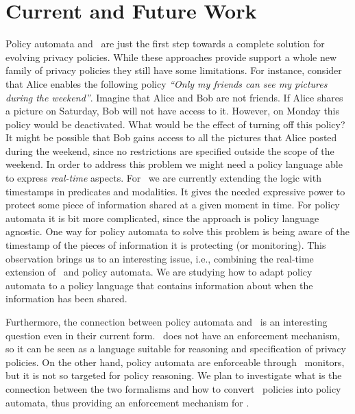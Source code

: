 \vspace{-4mm}
\section{Current and Future Work}

Policy automata and \tfppf~are just the first step towards a complete solution for evolving privacy policies. While these approaches provide support a whole new family of privacy policies they still have some limitations. For instance, consider that Alice enables the following policy \emph{``Only my friends can see my pictures during the weekend''}. Imagine that Alice and Bob are not friends. If Alice shares a picture on Saturday, Bob will not have access to it. However, on Monday this policy would be deactivated. What would be the effect of turning off this policy? It might be possible that Bob gains access to all the pictures that Alice posted during the weekend, since no restrictions are specified outside the scope of the weekend. In order to address this problem we might need a policy language able to express {\it real-time} aspects. For \tfppf~we are currently extending the logic with timestamps in predicates and modalities. It gives the needed expressive power to protect some piece of information shared at a given moment in time. For policy automata it is bit more complicated, since the approach is policy language agnostic. One way for policy automata to solve this problem is being aware of the timestamp of the pieces of information it is protecting (or monitoring). This observation brings us to an interesting issue, i.e., combining the real-time extension of \tfppf~and policy automata. We are studying how to adapt policy automata to a policy language that contains information about when the information has been shared.

Furthermore, the connection between policy automata and \tfppf~is an interesting question even in their current form. \tfppf~does not have an enforcement mechanism, so it can be seen as a language suitable for reasoning and specification of privacy policies. On the other hand, policy automata are enforceable through \larva~monitors, but it is not so targeted for policy reasoning. We plan to investigate what is the connection between the two formalisms and how to convert \tfppf~policies into policy automata, thus providing an enforcement mechanism for \tfppf.
\vspace{-4mm}
